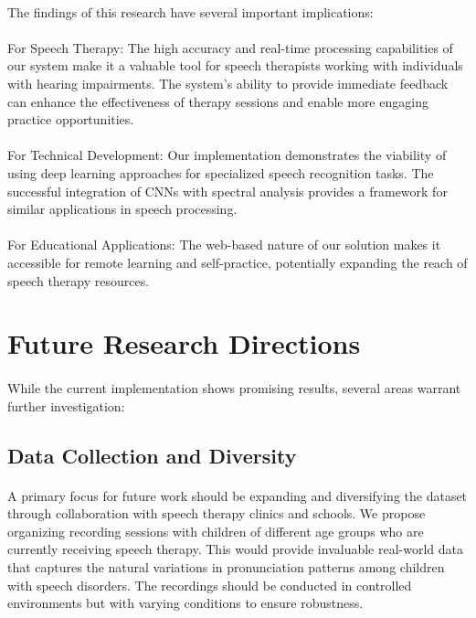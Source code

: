 \paragraph{}
The findings of this research have several important implications:

\paragraph{}
For Speech Therapy: The high accuracy and real-time processing capabilities of our system make it a valuable tool for speech therapists working with individuals with hearing impairments. The system's ability to provide immediate feedback can enhance the effectiveness of therapy sessions and enable more engaging practice opportunities.

\paragraph{}
For Technical Development: Our implementation demonstrates the viability of using deep learning approaches for specialized speech recognition tasks. The successful integration of CNNs with spectral analysis provides a framework for similar applications in speech processing.

\paragraph{}
For Educational Applications: The web-based nature of our solution makes it accessible for remote learning and self-practice, potentially expanding the reach of speech therapy resources.

\section{Future Research Directions}
\label{sec:future-directions}

\paragraph{}
While the current implementation shows promising results, several areas warrant further investigation:

\subsection{Data Collection and Diversity}
\label{subsec:data-future}

\paragraph{}
A primary focus for future work should be expanding and diversifying the dataset through collaboration with speech therapy clinics and schools. We propose organizing recording sessions with children of different age groups who are currently receiving speech therapy. This would provide invaluable real-world data that captures the natural variations in pronunciation patterns among children with speech disorders. The recordings should be conducted in controlled environments but with varying conditions to ensure robustness.

